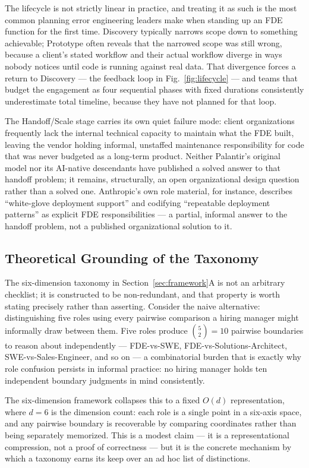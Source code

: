 \documentclass[journal]{IEEEtran}
\begin{document}
The lifecycle is not strictly linear in practice, and treating it as such is the most common planning error engineering leaders make when standing up an FDE function for the first time. Discovery typically narrows scope down to something achievable; Prototype often reveals that the narrowed scope was still wrong, because a client's stated workflow and their actual workflow diverge in ways nobody notices until code is running against real data. That divergence forces a return to Discovery --- the feedback loop in Fig.~\ref{fig:lifecycle} --- and teams that budget the engagement as four sequential phases with fixed durations consistently underestimate total timeline, because they have not planned for that loop.

The Handoff/Scale stage carries its own quiet failure mode: client organizations frequently lack the internal technical capacity to maintain what the FDE built, leaving the vendor holding informal, unstaffed maintenance responsibility for code that was never budgeted as a long-term product. Neither Palantir's original model nor its AI-native descendants have published a solved answer to that handoff problem; it remains, structurally, an open organizational design question rather than a solved one. Anthropic's own role material, for instance, describes ``white-glove deployment support'' and codifying ``repeatable deployment patterns'' as explicit FDE responsibilities \cite{anthropic2026fde} --- a partial, informal answer to the handoff problem, not a published organizational solution to it.

\subsection{Theoretical Grounding of the Taxonomy}

The six-dimension taxonomy in Section~\ref{sec:framework}A is not an arbitrary checklist; it is constructed to be non-redundant, and that property is worth stating precisely rather than asserting. Consider the naive alternative: distinguishing five roles using every pairwise comparison a hiring manager might informally draw between them. Five roles produce $\binom{5}{2} = 10$ pairwise boundaries to reason about independently --- FDE-vs-SWE, FDE-vs-Solutions-Architect, SWE-vs-Sales-Engineer, and so on --- a combinatorial burden that is exactly why role confusion persists in informal practice: no hiring manager holds ten independent boundary judgments in mind consistently.

The six-dimension framework collapses this to a fixed $O(d)$ representation, where $d = 6$ is the dimension count: each role is a single point in a six-axis space, and any pairwise boundary is recoverable by comparing coordinates rather than being separately memorized. This is a modest claim --- it is a representational compression, not a proof of correctness --- but it is the concrete mechanism by which a taxonomy earns its keep over an ad hoc list of distinctions.
\end{document}
